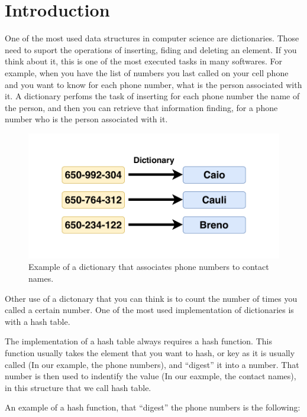 \chapter{Introduction}
\label{cap:Introduction}

One of the most used data structures in computer science are dictionaries. Those need to suport the operations of inserting, fiding and deleting an element. If you think about it, this is one of the most executed tasks in many softwares. For example, when you have the list of numbers you last called on your cell phone and you want to know for each phone number, what is the person associated with it. A dictionary perfoms the task of inserting for each phone number the name of the person, and then you can retrieve that information finding, for a phone number who is the person associated with it.


\begin{figure}[h!]
  \centering
  \includegraphics[width=12cm]{figuras/dictionary-example.pdf}
  \caption{Example of a dictionary that associates phone numbers to contact names. }
\end{figure}

Other use of a dictonary that you can think is to count the number of times you called a certain number. One of the most used implementation of dictionaries is with a hash table.

The implementation of a hash table always requires a hash function. This function usually takes the element that you want to hash, or key as it is usually called (In our example, the phone numbers), and ``digest'' it into a number. That number is then used to indentify the value (In our eaxmple, the contact names), in this structure that we call hash table.

An example of a hash function, that ``digest'' the phone numbers is the following: \\


